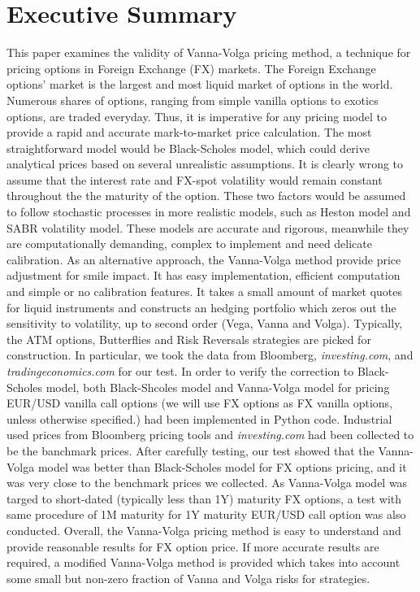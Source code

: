 \chapter{Executive Summary}
This paper examines the validity of Vanna-Volga pricing method, a technique for pricing options in Foreign Exchange (FX) markets. 
\newline
\newline
The Foreign Exchange options' market is the largest and most liquid market of options in the world. Numerous shares of options, ranging from simple vanilla options to exotics options, are traded everyday. Thus, it is imperative for any pricing model to provide a rapid and accurate mark-to-market price calculation.
\newline
\newline
The most straightforward model would be Black-Scholes model, which could derive analytical prices based on several unrealistic assumptions. It is clearly wrong to assume that the interest rate and FX-spot volatility would remain constant throughout the the maturity of the option. These two factors would be assumed to follow stochastic processes in more realistic models, such as Heston model and SABR volatility model. These models are accurate and rigorous, meanwhile they are computationally demanding, complex to implement and need delicate calibration. 
\newline
\newline
As an alternative approach, the Vanna-Volga method provide price adjustment for smile impact. It has easy implementation, efficient computation and simple or no calibration features. It takes a small amount of market quotes for liquid instruments and constructs an hedging portfolio which zeros out the sensitivity to volatility, up to second order (Vega, Vanna and Volga). Typically, the ATM options, Butterflies and Risk Reversals strategies are picked for construction. 
\newline
\newline
In particular, we took the data from Bloomberg, \textit{investing.com}, and \textit{tradingeconomics.com} for our test. In order to verify the correction to Black-Scholes model, both Black-Shcoles model and Vanna-Volga model for pricing EUR/USD vanilla call options (we will use FX options as FX vanilla options, unless otherwise specified.) had been implemented in Python code. Industrial used prices from Bloomberg pricing tools and \textit{investing.com} had been collected to be the banchmark prices. After carefully testing, our test showed that the Vanna-Volga model was better than Black-Scholes model for FX options pricing, and it was very close to the benchmark prices we collected. As Vanna-Volga model was targed to short-dated (typically less than 1Y) maturity FX options, a test with same procedure of 1M maturity for 1Y maturity EUR/USD call option was also conducted.
\newline
\newline
Overall, the Vanna-Volga pricing method is easy to understand and provide reasonable results for FX option price. If more accurate results are required, a modified Vanna-Volga method is provided which takes into account some small but non-zero fraction of Vanna and Volga risks for strategies.